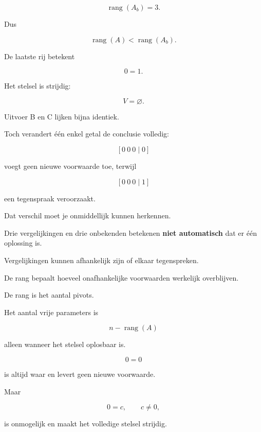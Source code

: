 \documentclass{ximera}
\begin{document}
\[
\operatorname{rang}(A_b)=3.
\]

Dus

\[
\operatorname{rang}(A)<\operatorname{rang}(A_b).
\]

De laatste rij betekent

\[
0=1.
\]

Het stelsel is strijdig:

\[
V=\varnothing.
\]


\begin{opmerking}
Uitvoer B en C lijken bijna identiek.

Toch verandert één enkel getal de conclusie volledig:

\[
[0\ 0\ 0\mid 0]
\]

voegt geen nieuwe voorwaarde toe, terwijl

\[
[0\ 0\ 0\mid 1]
\]

een tegenspraak veroorzaakt.

Dat verschil moet je onmiddellijk kunnen herkennen.
\end{opmerking}





\begin{opmerking}

Drie vergelijkingen en drie onbekenden betekenen \textbf{niet automatisch}
dat er één oplossing is.

Vergelijkingen kunnen afhankelijk zijn of elkaar tegenspreken.

De rang bepaalt hoeveel onafhankelijke voorwaarden werkelijk overblijven.
\end{opmerking}


\begin{opmerking}

De rang is het aantal pivots.

Het aantal vrije parameters is

\[
n-\operatorname{rang}(A)
\]

alleen wanneer het stelsel oplosbaar is.
\end{opmerking}


\begin{opmerking}[Fout 3: \(0=0\) en \(0=c\) verwarren]

\[
0=0
\]

is altijd waar en levert geen nieuwe voorwaarde.

Maar

\[
0=c,\qquad c\neq0,
\]

is onmogelijk en maakt het volledige stelsel strijdig.
\end{opmerking}
\end{document}
